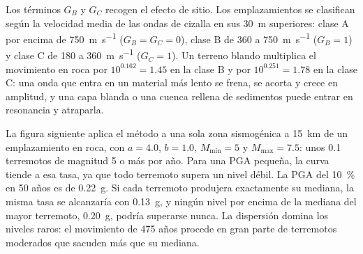 Los términos $G_B$ y $G_C$ recogen el efecto de sitio. Los emplazamientos se clasifican según la velocidad media de las
ondas de cizalla en sus \qty{30}{m} superiores: clase A por encima de \qty{750}{m.s^{-1}} ($G_B = G_C = 0$), clase B de
360 a \qty{750}{m.s^{-1}} ($G_B = 1$) y clase C de 180 a \qty{360}{m.s^{-1}} ($G_C = 1$). Un terreno
blando multiplica el movimiento en roca por $10^{0.162} = 1.45$ en la clase B y por $10^{0.251} = 1.78$ en la clase
C: una onda que entra en un material más lento se frena, se acorta y crece en amplitud, y una capa blanda o una
cuenca rellena de sedimentos puede entrar en resonancia y atraparla.

La figura siguiente aplica el método a una sola zona sismogénica a \qty{15}{km} de un emplazamiento en roca, con $a
= 4.0$, $b = 1.0$, $M_{\min} = 5$ y $M_{\max} = 7.5$: unos 0.1 terremotos de magnitud 5 o
más por año. Para una PGA pequeña, la curva tiende a esa tasa, ya que todo terremoto supera un nivel
débil. La PGA del \qty{10}{\percent} en 50 años es de \qty{0.22}{g}. Si cada terremoto produjera
exactamente su mediana, la misma tasa se alcanzaría con \qty{0.13}{g}, y ningún nivel por encima de la mediana
del mayor terremoto, \qty{0.20}{g}, podría superarse nunca. La dispersión domina los niveles
raros: el movimiento de 475 años procede en gran parte de terremotos moderados que sacuden más que su
mediana.

